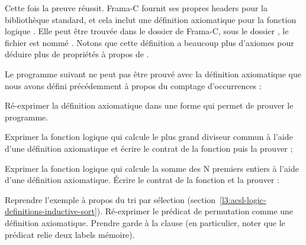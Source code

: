 

Cette fois la preuve réussit. Frama-C fournit ses propres headers pour
la bibliothèque standard, et cela inclut une définition axiomatique pour
la fonction logique . Elle peut être trouvée dans le
dossier de Frama-C, sous le dossier , le fichier est
nommé . Notons que cette définition
a beaucoup plus d'axiomes pour déduire plus de propriétés à propos de
.







Le programme suivant ne peut pas être prouvé avec la définition axiomatique
que nous avons défini précédemment à propos du comptage d'occurrences :




Ré-exprimer la définition axiomatique dans une forme qui permet de prouver le
programme.




Exprimer la fonction logique qui calcule le plus grand diviseur commun à l'aide
d'une définition axiomatique et écrire le contrat de la fonction 
puis la prouver ;






Exprimer la fonction logique qui calcule la somme des N premiers entiers à l'aide
d'une définition axiomatique. Écrire le contrat de la fonction 
et la prouver :






Reprendre l'exemple à propos du tri par sélection
(section~\ref{l3:acsl-logic-definitions-inductive-sort}). Ré-exprimer le
prédicat de permutation comme une définition axiomatique. Prendre garde à la
clause  (en particulier, noter que le prédicat relie deux
labels mémoire).


